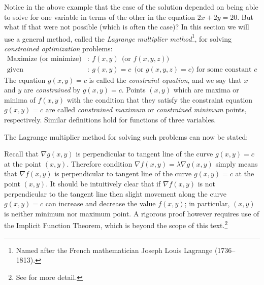 Notice in the above example that the ease of the solution depended on being able to solve for one variable in terms of the other in the equation $2x+2y=20$. 
But what if that were not possible (which is often the case)?
In this section we will use a general method, called the
\emph{Lagrange multiplier method}\footnote{Named after the French mathematician Joseph Louis Lagrange (1736--1813).}, for
solving \emph{constrained optimization} problems:
\begin{align*}
 \text{Maximize (or minimize)}&: ~ f(x,y) ~~\text{(or $f(x,y,z)$)}\\
 \text{given}&: ~ g(x,y) = c ~~\text{(or $g(x,y,z) = c$) for some constant $c$}
\end{align*}
The equation $g(x,y) = c$ is called the \emph{constraint equation}, and we say that $x$ and $y$ are \emph{constrained}
by $g(x,y) = c$. Points $(x,y)$ which are maxima or minima of $f(x,y)$ with the condition that they satisfy
the constraint equation $g(x,y)=c$ are called \emph{constrained maximum} or \emph{constrained minimum} points,
respectively. 
Similar definitions hold for functions of three variables.

The Lagrange multiplier method for solving such problems can now be stated:


Recall that $\nabla g(x,y)$ is perpendicular to tangent line of the curve $g(x,y) = c$ at the point $(x,y)$.
Therefore condition $\nabla f(x,y) = \lambda \nabla g(x,y)$ simply means that $\nabla f(x,y)$ is perpendicular to tangent line of the curve $g(x,y) = c$ at the point $(x,y)$.
It should be intuitively clear that if $\nabla f(x,y)$ is not perpendicular to the tangent line then slight movement along the curve $g(x,y) = c$ can increase and decrease the value $f(x,y)$;
in particular, $(x,y)$ is neither minimum nor maximum point.
A rigorous proof however requires use of the Implicit Function Theorem, which is beyond the scope of this
text.\footnote{See \cite[\S\,6.8]{tm} for more detail.} 

